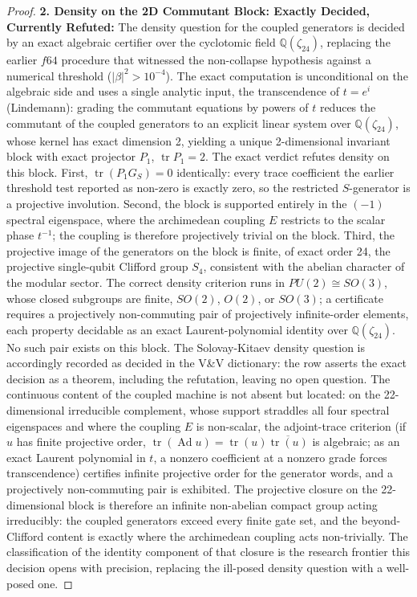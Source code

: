 \begin{proof}
\textbf{2. Density on the 2D Commutant Block: Exactly Decided, Currently Refuted:} The density question for the coupled generators is decided by an exact algebraic certifier over the cyclotomic field $\mathbb{Q}(\zeta_{24})$, replacing the earlier $f64$ procedure that witnessed the non-collapse hypothesis against a numerical threshold ($|\beta|^2 > 10^{-4}$). The exact computation is unconditional on the algebraic side and uses a single analytic input, the transcendence of $t = e^{i}$ (Lindemann): grading the commutant equations by powers of $t$ reduces the commutant of the coupled generators to an explicit linear system over $\mathbb{Q}(\zeta_{24})$, whose kernel has exact dimension 2, yielding a unique 2-dimensional invariant block with exact projector $P_1$, $\operatorname{tr} P_1 = 2$. The exact verdict refutes density on this block. First, $\operatorname{tr}(P_1 G_S) = 0$ identically: every trace coefficient the earlier threshold test reported as non-zero is exactly zero, so the restricted $S$-generator is a projective involution. Second, the block is supported entirely in the $(-1)$ spectral eigenspace, where the archimedean coupling $E$ restricts to the scalar phase $t^{-1}$; the coupling is therefore projectively trivial on the block. Third, the projective image of the generators on the block is finite, of exact order 24, the projective single-qubit Clifford group $S_4$, consistent with the abelian character of the modular sector. The correct density criterion runs in $PU(2) \cong SO(3)$, whose closed subgroups are finite, $SO(2)$, $O(2)$, or $SO(3)$; a certificate requires a projectively non-commuting pair of projectively infinite-order elements, each property decidable as an exact Laurent-polynomial identity over $\mathbb{Q}(\zeta_{24})$. No such pair exists on this block. The Solovay-Kitaev density question is accordingly recorded as decided in the V\&V dictionary: the row asserts the exact decision as a theorem, including the refutation, leaving no open question. The continuous content of the coupled machine is not absent but located: on the 22-dimensional irreducible complement, whose support straddles all four spectral eigenspaces and where the coupling $E$ is non-scalar, the adjoint-trace criterion (if $u$ has finite projective order, $\operatorname{tr}(\operatorname{Ad} u) = \operatorname{tr}(u)\overline{\operatorname{tr}(u)}$ is algebraic; as an exact Laurent polynomial in $t$, a nonzero coefficient at a nonzero grade forces transcendence) certifies infinite projective order for the generator words, and a projectively non-commuting pair is exhibited. The projective closure on the 22-dimensional block is therefore an infinite non-abelian compact group acting irreducibly: the coupled generators exceed every finite gate set, and the beyond-Clifford content is exactly where the archimedean coupling acts non-trivially. The classification of the identity component of that closure is the research frontier this decision opens with precision, replacing the ill-posed density question with a well-posed one.


\end{proof}
